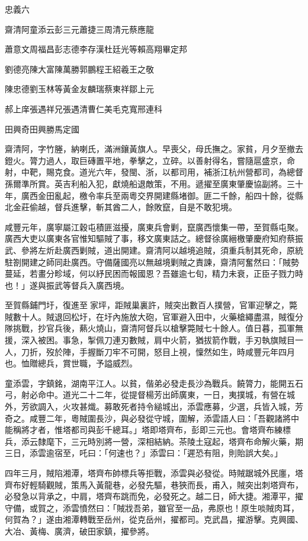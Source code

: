 
\begin{pinyinscope}
忠義六

齋清阿童添云彭三元蕭捷三周清元蔡應龍

蕭意文周福昌彭志德李存漢杜廷光等賴高翔畢定邦

劉德亮陳大富陳萬勝郭鵬程王紹羲王之敬

陳忠德劉玉林等黃金友麟瑞蔡東祥鄒上元

郝上庠張遇祥兄張遇清曹仁美毛克寬邢連科

田興奇田興勝馬定國

齋清阿，字竹塍，納喇氏，滿洲鑲黃旗人。早喪父，母氏撫之。家貧，月夕至撤去鐙火。膂力過人，取巨磚置平地，拳擊之，立碎。以善射得名，嘗隨扈盛京，命射，中靶，賜克食。道光六年，發閩、浙，以都司用，補浙江杭州營都司，為總督孫爾準所賞。英吉利船入犯，獻燒船退敵策，不用。遞擢至廣東肇慶協副將。三十年，廣西金田亂起，檄令率兵至兩粵交界開建縣堵御。匪二千餘，船四十餘，從縣北金莊偷越，督兵進擊，斬其酋二人，餘敗竄，自是不敢犯境。

咸豐元年，廣寧屬江穀屯積匪滋擾，廣東兵會剿，竄廣西懷集一帶，至賀縣屯聚。廣西大吏以廣東各官惟知驅賊了事，移文廣東詰之。總督徐廣縉檄肇慶府知府蔡振武、參將左炘赴廣西剿賊，道出開建。齋清阿以越境追賊，須重兵制其死命，原統駐劄開建之師同赴廣西。守備薩國亮以無越境剿賊之責諫，齋清阿奮然曰：「賊勢蔓延，若畫分畛域，何以紓民困而報國恩？吾雖逾七旬，精力未衰，正臣子戮力時也！」遂與振武等督兵入廣西境。

至賀縣鋪門圩，復進至家坪，距賊巢裏許，賊突出數百人撲營，官軍迎擊之，斃賊數十人。賊退回松圩，在圩內施放大砲，官軍避入田中，火藥槍繩盡濕，賊復分隊挑戰，抄官兵後，爇火燒山，齋清阿督兵以槍擊斃賊七十餘人。值日暮，孤軍無援，深入被困。事急，掣佩刀連刃數賊，肩中火箭，猶拔箭作戰，手刃執旗賊目一人，刀折，歿於陣，手握斷刀牢不可開，怒目上視，懍然如生，時咸豐元年四月也。恤贈總兵，賞世職，予謚威烈。

童添雲，字鎮銘，湖南平江人。以貧，偕弟必發走長沙為戰兵。饒膂力，能開五石弓，射必命中。道光二十二年，從提督楊芳出師廣東，一日，夷撲城，有營在城外，芳欲調入，火攻甚熾。募敢死者持令縋城出，添雲應募，少選，兵皆入城，芳奇之。咸豐二年，粵賊圍長沙，與必發從守城，圍解，添雲語人曰：「吾觀諸將中能稱將才者，惟塔都司與彭千總耳。」塔即塔齊布，彭即三元也。會塔齊布練標兵，添云隸麾下，三元時別將一營，深相結納。茶陵土寇起，塔齊布命解火藥，期三日，添雲逾宿至，吒曰：「何速也？」添雲曰：「遲恐有阻，則貽誤大矣。」

四年三月，賊陷湘潭，塔齊布帥標兵等拒戰，添雲與必發從。時賊踞城外民廛，塔齊布好輕騎觀賊，策馬入黃龍巷，必發先驅，巷狹而長，甫入，賊突出刺塔齊布，必發急以背承之，中肩，塔齊布跳而免，必發死之。越二日，師大捷。湘潭平，擢守備，或賀之，添雲憤然曰：「賊戕吾弟，雖官至一品，弗原也！原生啖賊肉耳，何賀為？」遂由湘潭轉戰至岳州，從克岳州，擢都司。克武昌，擢游擊。克興國、大冶、黃梅、廣濟，破田家鎮，擢參將。


\end{pinyinscope}
